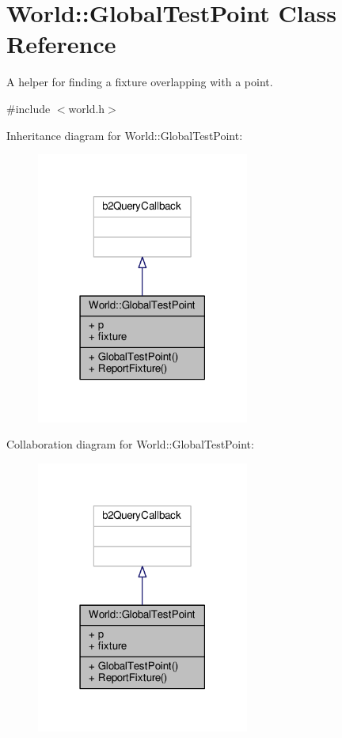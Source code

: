 \hypertarget{classWorld_1_1GlobalTestPoint}{}\section{World\+:\+:Global\+Test\+Point Class Reference}
\label{classWorld_1_1GlobalTestPoint}


A helper for finding a fixture overlapping with a point.  




{\ttfamily \#include $<$world.\+h$>$}



Inheritance diagram for World\+:\+:Global\+Test\+Point\+:\nopagebreak
\begin{figure}[H]
\begin{center}
\leavevmode
\includegraphics[width=198pt]{classWorld_1_1GlobalTestPoint__inherit__graph}
\end{center}
\end{figure}


Collaboration diagram for World\+:\+:Global\+Test\+Point\+:\nopagebreak
\begin{figure}[H]
\begin{center}
\leavevmode
\includegraphics[width=198pt]{classWorld_1_1GlobalTestPoint__coll__graph}
\end{center}
\end{figure}
